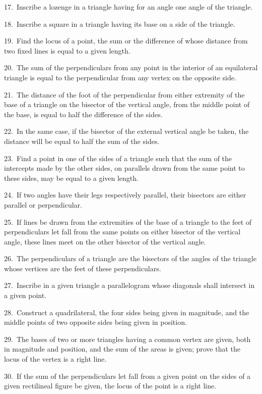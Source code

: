 \documentclass[oneside]{book}
\begin{document}
\begin{footnotesize}
17.~Inscribe a lozenge in a triangle having for an angle one
angle of the triangle.


18.~Inscribe a square in a triangle having its base on a side of
the triangle.

19.~Find the locus of a point, the sum or the difference of
whose distance from two fixed lines is equal to a given length.

20.~The sum of the perpendiculars from any point in the
interior of an equilateral triangle is equal to the perpendicular from
any vertex on the opposite side.

21.~The distance of the foot of the perpendicular from either
extremity of the base of a triangle on the bisector of the vertical
angle, from the middle point of the base, is equal to half the
difference of the sides.

22.~In the same case, if the bisector of the external vertical
angle be taken, the distance will be equal to half the sum of the
sides.

23.~Find a point in one of the sides of a triangle such that the
sum of the intercepts made by the other sides, on parallels drawn
from the same point to these sides, may be equal to a given length.

24.~If two angles have their legs respectively parallel, their
bisectors are either parallel or perpendicular.

25.~If lines be drawn from the extremities of the base of a
triangle to the feet of perpendiculars let fall from the same points
on either bisector of the vertical angle, these lines meet on the
other bisector of the vertical angle.

26.~The perpendiculars of a triangle are the bisectors of the
angles of the triangle whose vertices are the feet of these
perpendiculars.

27.~Inscribe in a given triangle a parallelogram whose diagonals
shall intersect in a given point.

28.~Construct a quadrilateral, the four sides being given in
magnitude, and the middle points of two opposite sides being
given in position.

29.~The bases of two or more triangles having a common
vertex are given, both in magnitude and position, and the sum of the
areas is given; prove that the locus of the vertex is a right line.

30.~If the sum of the perpendiculars let fall from a given
point on the sides of a given rectilineal figure be given, the locus
of the point is a right line.


\end{footnotesize}
\end{document}

